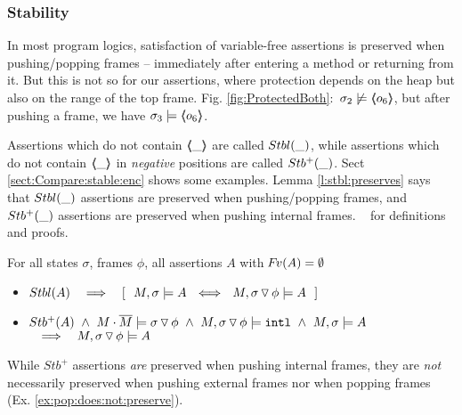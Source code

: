 \subsubsection{{Stability}} %
\label{s:preserve:call:ret}
In most program logics, satisfaction of  variable-free assertions  is preserved when pushing/popping frames
-- \ie immediately after entering a method or  returning from it.
But this is not  so for our assertions, where protection depends %
on the heap but also 
on the range of %
the top frame. \Eg  Fig. \ref{fig:ProtectedBoth}:\  
$\sigma_2 \not\models \langle\!\!\langle o_6 \rangle\!\!\rangle$, but after pushing a frame, we have $\sigma_3  \models \langle\!\!\langle o_6 \rangle\!\!\rangle$.
 
 

{Assertions} which do  not contain  $\langle\!\!\langle \_ \rangle\!\!\rangle$   are called ${Stbl( \_ )}$, 
while assertions which do  not contain $\langle\!\!\langle \_ \rangle\!\!\rangle$ in \emph{negative} positions are called ${Stb^+( \_ )}$. 
Sect \ref{sect:Compare:stable:enc} shows some examples.
Lemma \ref{l:stbl:preserves} says that ${Stbl( \_ )}$ assertions are  preserved when pushing/popping frames,
and ${Stb^+( \_ )}$ assertions are preserved when pushing  {internal} frames.
\Cf    \A\ \aref{D}{\ref{app:preserve}} for   definitions and proofs. 

\begin{lemma}
For all  states $\sigma$, frames $\phi$,   all assertions $A$ with  ${\hspace{-1pt}F\hspace{-1pt}}v(A)=\emptyset $
\label{l:preserve:asrt}
\label{l:stbl:preserves} 
\begin{itemize}
\item 
$\Stable{A} \  \ \  \Longrightarrow  \  \ \  [\ \ M, \sigma \models A \ \ \Longleftrightarrow \ \  M,{\PushSLong \phi \sigma} \models A\ \ ]$
\item 
\label{l:preserve:asrt:two}
${Stb^+( A )}   \ \wedge    \ {M\cdot\overline{M} \models {\ensuremath{ \sigma \, {\triangledown}\, \phi}}}\  \wedge\  M, { \sigma \, {\triangledown}\, \phi} \models  \mbox{\normalfont{\texttt{intl}}}\  \wedge  \ M, \sigma \models A $
$\  \ \ \Longrightarrow \ \  \ M,{ \sigma \, {\triangledown}\, \phi} \models A\ $
\end{itemize}
\end{lemma}


While $Stb^+$ assertions \emph{are} preserved  when pushing  internal frames,   they  are \emph{not} necessarily preserved when pushing  external frames  
nor when popping frames   (\cf Ex. \ref{ex:pop:does:not:preserve}). 

